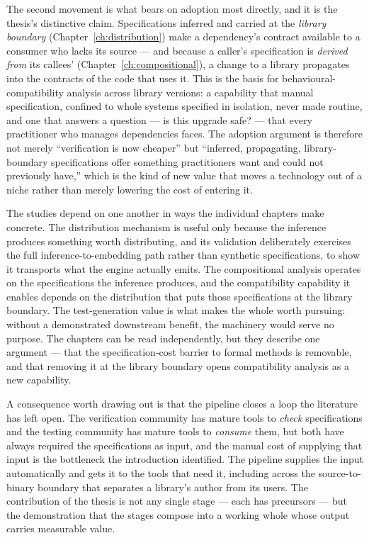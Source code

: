The second movement is what bears on adoption most directly, and it is the
thesis's distinctive claim. Specifications inferred and carried at the
\emph{library boundary} (Chapter~\ref{ch:distribution}) make a dependency's
contract available to a consumer who lacks its source --- and because a caller's
specification is \emph{derived from} its callees' (Chapter~\ref{ch:compositional}),
a change to a library propagates into the contracts of the code that uses it. This
is the basis for behavioural-compatibility analysis across library versions: a
capability that manual specification, confined to whole systems specified in
isolation, never made routine, and one that answers a question --- is this upgrade
safe? --- that every practitioner who manages dependencies faces. The adoption
argument is therefore not merely ``verification is now cheaper'' but ``inferred,
propagating, library-boundary specifications offer something practitioners want and
could not previously have,'' which is the kind of new value that moves a technology
out of a niche rather than merely lowering the cost of entering it.

The studies depend on one another in ways the individual chapters make concrete.
The distribution mechanism is useful only because the inference produces something
worth distributing, and its validation deliberately exercises the full
inference-to-embedding path rather than synthetic specifications, to show it
transports what the engine actually emits. The compositional analysis operates on
the specifications the inference produces, and the compatibility capability it
enables depends on the distribution that puts those specifications at the library
boundary. The test-generation value is what makes the whole worth pursuing: without
a demonstrated downstream benefit, the machinery would serve no purpose. The
chapters can be read independently, but they describe one argument --- that the
specification-cost barrier to formal methods is removable, and that removing it at
the library boundary opens compatibility analysis as a new capability.

A consequence worth drawing out is that the pipeline closes a loop the
literature has left open. The verification community has mature tools to
\emph{check} specifications and the testing community has mature tools to
\emph{consume} them, but both have always required the specifications as input,
and the manual cost of supplying that input is the bottleneck the introduction
identified. The pipeline supplies the input automatically and gets it to the
tools that need it, including across the source-to-binary boundary that
separates a library's author from its users. The contribution of the thesis is
not any single stage --- each has precursors --- but the demonstration that the
stages compose into a working whole whose output carries measurable value.

